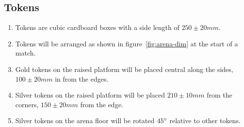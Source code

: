 \subsection{Tokens}
\label{sub:Tokens}
\begin{enumerate}
\item Tokens are cubic cardboard boxes with a side length of $250 \pm 20 mm$.

\item Tokens will be arranged as shown in figure~\ref{fig:arena-dim} at the start of a match.

\item Gold tokens on the raised platform will be placed central along the sides,  $100 \pm 20 mm$ in from the edges.

\item Silver tokens on the raised platform will be placed $210 \pm 10 mm$ from the corners, $150 \pm 20 mm$ from the edge.

\item Silver tokens on the arena floor will be rotated $45\degree$ relative to other tokens.

\end{enumerate}

\clearpage
